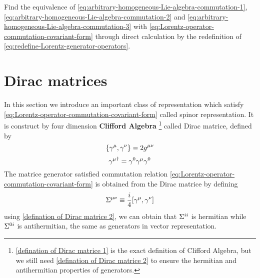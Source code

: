 \begin{Exe}
  Find the equivalence of \eqref{eq:arbitrary-homogeneous-Lie-algebra-commutation-1}, \eqref{eq:arbitrary-homogeneous-Lie-algebra-commutation-2} and \eqref{eq:arbitrary-homogeneous-Lie-algebra-commutation-3} with \eqref{eq:Lorentz-operator-commutation-covariant-form} through direct calculation by the redefinition of \eqref{eq:redefine-Lorentz-generator-operators}.
\end{Exe}

\section{Dirac matrices}

In this section we introduce an important class of representation which satisfy
\eqref{eq:Lorentz-operator-commutation-covariant-form} called spinor representation.
It is construct by four dimension \textbf{Clifford Algebra}
\footnote{\eqref{defination of Dirac matrice 1} is the exact definition of Clifford Algebra, but we still need \eqref{defination of Dirac matrice 2} to ensure the hermitian and antihermitian properties of generators. } called Dirac matrice, defined by
\begin{equation} \label{defination of Dirac matrice 1}
\acomm{\g^{\m}}{\g^{\n}} = 2g^{\m\n}
\end{equation}
\begin{equation} \label{defination of Dirac matrice 2}
{\gamma^{\mu}}^{\dagger} = \gamma^0\gamma^{\mu}\gamma^0
\end{equation}
The matrice generator satisfied commutation relation \eqref{eq:Lorentz-operator-commutation-covariant-form} is obtained from the Dirac matrice by defining
\begin{equation} \label{definition of generators in Dirac representation}
\Si^{\m\n}\equiv \frac{i}{4}\comm{\g^{\m}}{\g^{\n}}
\end{equation}
using \eqref{defination of Dirac matrice 2}, we can obtain that $\Sigma^{ii}$ is hermitian while $\Sigma^{0i}$ is antihermitian, the same as generators in vector representation.

